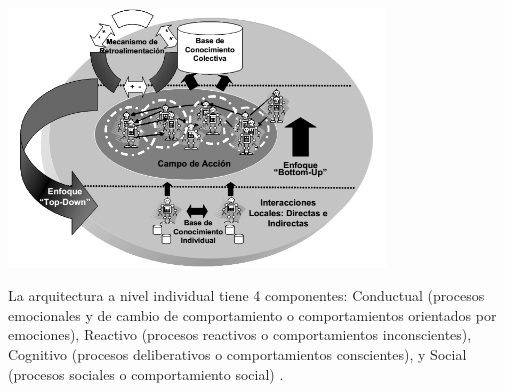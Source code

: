 \begin{ilustracion}[fuente=\cite{perozo2011}, etiqueta=componente-masoes, titulo={Componentes de MASOES a Nivel Colectivo}]
\includegraphics[width=10cm]{ilustraciones/marco-teorico/componente-masoes.jpg}
\end{ilustracion}


La arquitectura a nivel individual tiene 4 componentes: Conductual (procesos
emocionales y de cambio de comportamiento o comportamientos orientados por
emociones), Reactivo (procesos reactivos o comportamientos inconscientes),
Cognitivo (procesos deliberativos o comportamientos conscientes), y Social
(procesos sociales o comportamiento social) .

